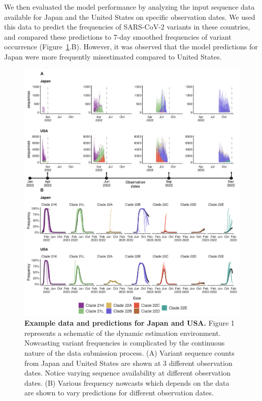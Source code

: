 \documentclass[11pt,oneside,letterpaper]{article}
\begin{document}
We then evaluated the model performance by analyzing the input sequence data available for Japan and the United States on specific observation dates.
We used this data to predict the frequencies of SARS-CoV-2 variants in these countries, and compared these predictions to 7-day smoothed frequencies of variant occurrence (Figure~\ref{LiveNowcasts}.B).
However, it was observed that the model predictions for Japan were more frequently misestimated compared to United States.



\begin{figure}[H]
	\centering
	\includegraphics[width=0.8\textwidth=0.01]{figures/Dynamic_est_env.png}
	\caption{\textbf{Example data and predictions for Japan and USA.}
	Figure 1 represents a schematic of the dynamic estimation environment.
	Nowcasting variant frequencies is complicated by the continuous nature of the data submission process.
	(A) Variant sequence counts from Japan and United States are shown at 3 different observation dates.
	Notice varying sequence availability at different observation dates. 
	(B) Various frequency nowcasts which depends on the data are shown to vary predictions for different observation dates. 
	}
	\label{LiveNowcasts}
\end{figure}
\end{document}
